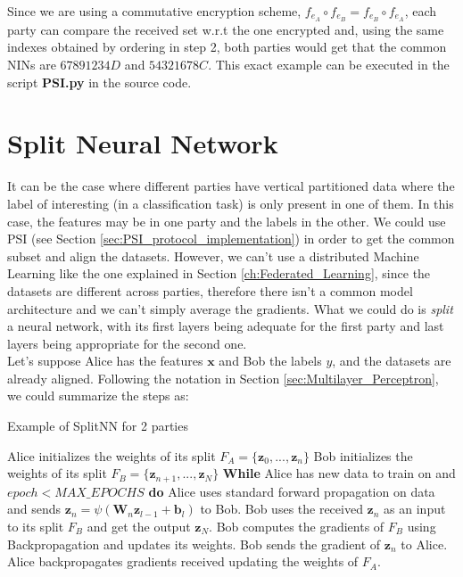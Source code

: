 Since we are using a commutative encryption scheme, $f_{e_A} \circ f_{e_B} = f_{e_B} \circ f_{e_A}$, each party can compare the received set w.r.t the one encrypted and, using the same indexes obtained by ordering in step 2, both parties would get that the common NINs are $67891234D$ and $54321678C$. This exact example can be executed in the script \textbf{PSI.py} in the source code.

\section{Split Neural Network}

It can be the case where different parties have vertical partitioned data where the label of interesting (in a classification task) is only present in one of them. In this case, the features may be in one party and the labels in the other. We could use PSI (see Section \ref{sec:PSI_protocol_implementation}) in order to get the common subset and align the datasets.
However, we can't use a distributed Machine Learning like the one explained in Section \ref{ch:Federated_Learning}, since the datasets are different across parties, therefore there isn't a common model architecture and we can't simply average the gradients. What we could do is \textit{split} a neural network, with its first layers being adequate for the first party and last layers being appropriate for the second one.\\
Let's suppose Alice has the features $\boldsymbol{x}$ and Bob the labels $y$, and the datasets are already aligned. Following the notation in Section \ref{sec:Multilayer_Perceptron}, we could summarize the steps as:


\begin{algorithm}
\caption{Example of SplitNN for 2 parties}
\label{alg:SplitNN}
\begin{algorithmic}[1]
    \State Alice initializes the weights of its split $F_A = \{\boldsymbol{z}_0,...,\boldsymbol{z}_n\}$
    \State Bob initializes the weights of its split $F_B = \{\boldsymbol{z}_{n+1},...,\boldsymbol{z}_N\}$
    \State \textbf{While} Alice has new data to train on and $epoch < MAX\_EPOCHS$  \textbf{do}
    \State \hspace*{1 em} Alice uses standard forward propagation on data and sends $\boldsymbol{z}_n = \psi(\boldsymbol{W}_n \boldsymbol{z}_{l-1} + \boldsymbol{b}_l)$ to Bob.
    \State \hspace*{1 em} Bob uses the received $\boldsymbol{z}_n$ as an input to its split $F_B$ and get the output $\boldsymbol{z}_N$.
    \State \hspace*{1 em} Bob computes the gradients of $F_B$ using Backpropagation and updates its weights.
    \State \hspace*{1 em} Bob sends the gradient of $\boldsymbol{z}_n$ to Alice.
    \State \hspace*{1 em} Alice backpropagates gradients received updating the weights of $F_A$.
\end{algorithmic}
\end{algorithm}

